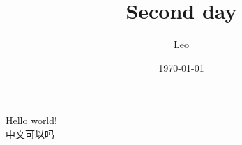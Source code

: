 \documentclass{article}        %
\title{Second day}
\author{Leo}
\date{\today}
\begin{document}
Hello world! \\
中文可以吗
\end{document}
